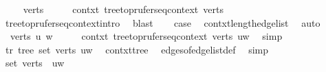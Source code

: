 \begin{isabellebody}
\ \ \isamarkupfalse%
\ {\isacharparenleft}{\kern0pt}{}\ verts{\isacharparenright}{\kern0pt}\isanewline
\ \ \isamarkupfalse%
\ \isamarkupfalse%
\ contxt{\isacharcolon}{\kern0pt}\ tree{\isacharunderscore}{\kern0pt}to{\isacharunderscore}{\kern0pt}prufer{\isacharunderscore}{\kern0pt}seq{\isacharunderscore}{\kern0pt}context\ verts\ {\isachardoublequoteopen}{\isacharbrackleft}{\kern0pt}{\isacharbrackright}{\kern0pt}{\isachardoublequoteclose}\ \isamarkupfalse%
\ tree{\isacharunderscore}{\kern0pt}to{\isacharunderscore}{\kern0pt}prufer{\isacharunderscore}{\kern0pt}seq{\isacharunderscore}{\kern0pt}context{\isachardot}{\kern0pt}intro\ \isamarkupfalse%
\ blast\isanewline
\ \ \isamarkupfalse%
\ {\isacharquery}{\kern0pt}case\ \isamarkupfalse%
\ contxt{\isachardot}{\kern0pt}length{\isacharunderscore}{\kern0pt}edge{\isacharunderscore}{\kern0pt}list\ \isamarkupfalse%
\ auto\isanewline
{}\isamarkupfalse%
\isanewline
\ \ \isamarkupfalse%
\ {\isacharparenleft}{\kern0pt}{}\ verts\ u\ w{\isacharparenright}{\kern0pt}\isanewline
\ \ \isamarkupfalse%
\ \isamarkupfalse%
\ contxt{\isacharcolon}{\kern0pt}\ tree{\isacharunderscore}{\kern0pt}to{\isacharunderscore}{\kern0pt}prufer{\isacharunderscore}{\kern0pt}seq{\isacharunderscore}{\kern0pt}context\ verts\ {\isachardoublequoteopen}{\isacharbrackleft}{\kern0pt}{\isacharparenleft}{\kern0pt}u{\isacharcomma}{\kern0pt}w{\isacharparenright}{\kern0pt}{\isacharbrackright}{\kern0pt}{\isachardoublequoteclose}\ \isamarkupfalse%
\ simp\isanewline
\ \ \isamarkupfalse%
\ tr{\isacharcolon}{\kern0pt}\ tree\ {\isachardoublequoteopen}set\ verts{\isachardoublequoteclose}\ {\isachardoublequoteopen}{\isacharbraceleft}{\kern0pt}{\isacharbraceleft}{\kern0pt}u{\isacharcomma}{\kern0pt}w{\isacharbraceright}{\kern0pt}{\isacharbraceright}{\kern0pt}{\isachardoublequoteclose}\ \isamarkupfalse%
\ contxt{\isachardot}{\kern0pt}tree\ \isamarkupfalse%
\ edges{\isacharunderscore}{\kern0pt}of{\isacharunderscore}{\kern0pt}edge{\isacharunderscore}{\kern0pt}list{\isacharunderscore}{\kern0pt}def\ \isamarkupfalse%
\ simp\isanewline
\ \ \isamarkupfalse%
\ {\isachardoublequoteopen}set\ verts\ {\isacharequal}{\kern0pt}\ {\isacharbraceleft}{\kern0pt}u{\isacharcomma}{\kern0pt}w{\isacharbraceright}{\kern0pt}{\isachardoublequoteclose}\ \isamarkupfalse%

\end{isabellebody}

